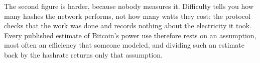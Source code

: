 The second figure is harder, because nobody measures it. Difficulty tells you how many hashes the network performs, not how many watts they cost: the protocol checks that the work was done and records nothing about the electricity it took. Every published estimate of Bitcoin's power use therefore rests on an assumption, most often an efficiency that someone modeled, and dividing such an estimate back by the hashrate returns only that assumption. %

